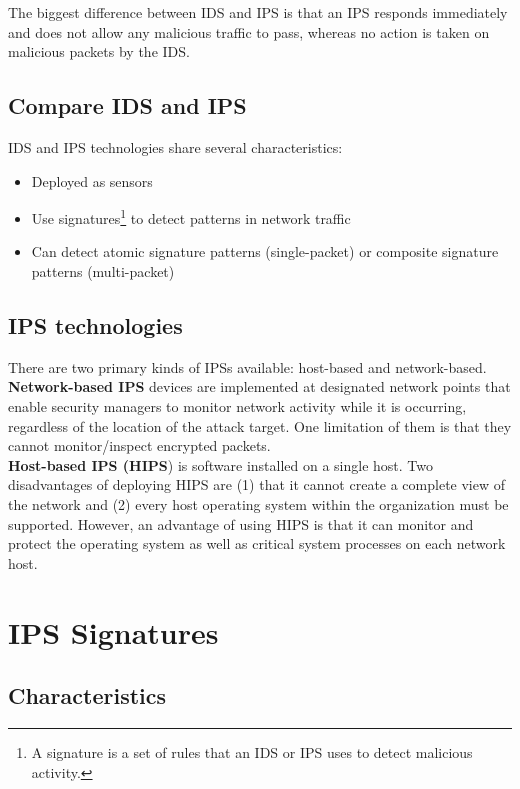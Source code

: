 The biggest difference between IDS and IPS is that an IPS responds immediately and does not allow any malicious traffic to pass, whereas no action is taken on malicious packets by the IDS.

\subsection{Compare IDS and IPS}

IDS and IPS technologies share several characteristics:

\begin{itemize}
\item Deployed as sensors
\item Use signatures\footnote{A signature is a set of rules that an IDS or IPS uses to detect malicious activity.} to detect patterns in network traffic
\item Can detect atomic signature patterns (single-packet) or composite signature patterns (multi-packet)
\end{itemize}

\subsection{IPS technologies}

There are two primary kinds of IPSs available: host-based and network-based. \\

\textbf{Network-based IPS} devices are implemented at designated network points that enable security managers to monitor network activity while it is occurring, regardless of the location of the attack target. One limitation of them is that they cannot monitor/inspect encrypted packets.\\

\textbf{Host-based IPS (HIPS}) is software installed on a single host. Two disadvantages of deploying HIPS are (1) that it cannot create a complete view of the network and (2) every host operating system within the organization must be supported. However, an advantage of using HIPS is that it can monitor and protect the operating system as well as critical system processes on each network host.

\section{IPS Signatures}

\subsection{Characteristics}

